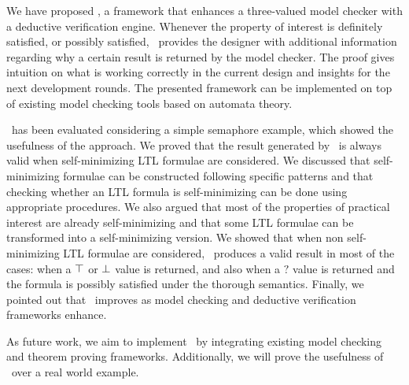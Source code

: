 We have proposed \NAME, a framework that enhances a three-valued model checker with a deductive verification engine. 
Whenever the property of interest is definitely satisfied, or possibly satisfied, \NAME\ provides the designer with additional information regarding why a certain result is returned by the model checker.
The proof gives intuition on what is working correctly in the current design and insights for the next development rounds.
The  presented framework can be implemented on top of existing model checking tools based on automata theory.

\NAME\ has been evaluated considering a simple semaphore example, which showed  the usefulness  of the approach.
We proved that the result generated by \NAME\ is always valid when self-minimizing LTL formulae are considered.
We discussed that self-minimizing formulae can be constructed following specific patterns and that checking whether an LTL formula is self-minimizing can be done using appropriate procedures.
We also argued that most of the properties of practical interest are already self-minimizing and that some LTL formulae can be transformed into a self-minimizing version.
We showed that when non self-minimizing LTL formulae are considered, \NAME\ produces a valid result in most of the cases: when a $\operatorname{\top}$ or $\operatorname{\bot}$ value is returned, and also when a $?$ value is returned and the formula is possibly satisfied under the thorough semantics.
Finally, we pointed out that \NAME\ improves as model checking and deductive verification frameworks enhance. 

As future work, we aim to implement \NAME\ by integrating  existing model checking and theorem proving frameworks.
Additionally, we will prove the usefulness of \NAME\ over a real world example.
